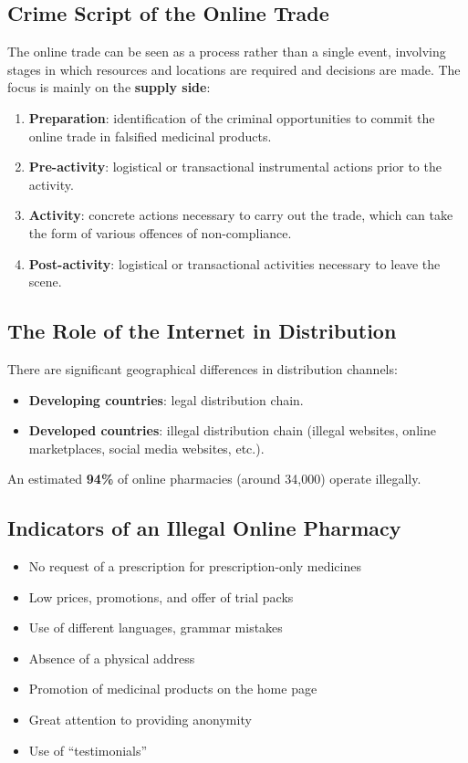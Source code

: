 \documentclass[11pt,a4paper,openany]{report}
\theoremstyle{definition}
\theoremstyle{plain}
\theoremstyle{remark}
\begin{document}
\subsection{Crime Script of the Online Trade}

The online trade can be seen as a process rather than a single event, involving stages in which resources and locations are required and decisions are made. The focus is mainly on the \textbf{supply side}:

\begin{enumerate}
    \item \textbf{Preparation}: identification of the criminal opportunities to commit the online trade in falsified medicinal products.
    \item \textbf{Pre-activity}: logistical or transactional instrumental actions prior to the activity.
    \item \textbf{Activity}: concrete actions necessary to carry out the trade, which can take the form of various offences of non-compliance.
    \item \textbf{Post-activity}: logistical or transactional activities necessary to leave the scene.
\end{enumerate}

\subsection{The Role of the Internet in Distribution}

There are significant geographical differences in distribution channels:

\begin{itemize}
    \item \textbf{Developing countries}: legal distribution chain.
    \item \textbf{Developed countries}: illegal distribution chain (illegal websites, online marketplaces, social media websites, etc.).
\end{itemize}

An estimated \textbf{94\%} of online pharmacies (around 34,000) operate illegally.

\subsection{Indicators of an Illegal Online Pharmacy}

\begin{itemize}
    \item No request of a prescription for prescription-only medicines
    \item Low prices, promotions, and offer of trial packs
    \item Use of different languages, grammar mistakes
    \item Absence of a physical address
    \item Promotion of medicinal products on the home page
    \item Great attention to providing anonymity
    \item Use of ``testimonials''
\end{itemize}
\end{document}
